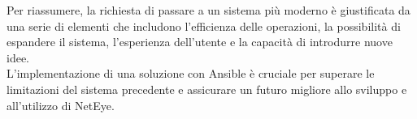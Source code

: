 Per riassumere, la richiesta di passare a un sistema più moderno è giustificata
da una serie di elementi che includono l'efficienza delle operazioni, la possibilità
di espandere il sistema, l'esperienza dell'utente e la capacità di introdurre
nuove idee.\\ L'implementazione di una soluzione con Ansible è cruciale per
superare le limitazioni del sistema precedente e assicurare un futuro migliore
allo sviluppo e all'utilizzo di NetEye.